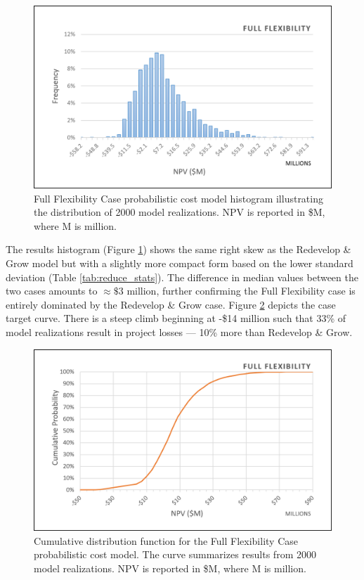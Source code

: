 \begin{figure}[!htp]
\centering
\includegraphics[width=.85\textwidth]{templates/images/Figure-Reduce_Case_Histogram.png}
\caption[Full Flexibility Case histogram]{Full Flexibility Case probabilistic cost model histogram illustrating the distribution of 2000 model realizations. NPV is reported in \$M, where M is million.}
\label{fig:reduce_case_hist}
\end{figure}

The results histogram (Figure \ref{fig:reduce_case_hist}) shows the same right skew as the Redevelop \& Grow model but with a slightly more compact form based on the lower standard deviation (Table \ref{tab:reduce_stats}). The difference in median values between the two cases amounts to $\approx\$3$ million, further confirming the Full Flexibility case is entirely dominated by the Redevelop \& Grow case. Figure \ref{fig:reduce_case_cdf} depicts the case target curve. There is a steep climb beginning at -\$14 million such that 33\% of model realizations result in project losses --- 10\% more than Redevelop \& Grow.

\begin{figure}[!htp]
\centering
\includegraphics[width=.85\textwidth]{templates/images/Figure-Reduce_Case_CDF.png}
\caption[Full Flexibility Case CDF]{Cumulative distribution function for the Full Flexibility Case probabilistic cost model. The curve summarizes results from 2000 model realizations. NPV is reported in \$M, where M is million.}
\label{fig:reduce_case_cdf}
\end{figure}

